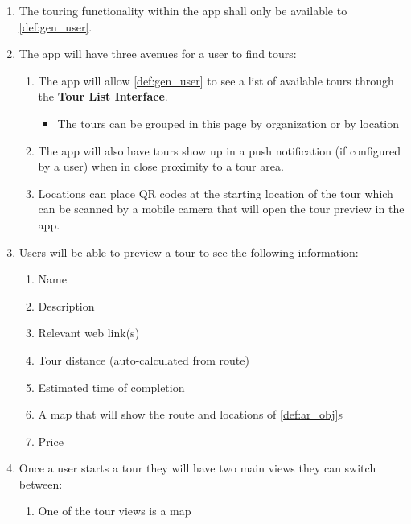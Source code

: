 \documentclass{article}
\begin{document}
\begin{enumerate}[align=left, label=\textbf{TR-FR\arabic*:}]
    \item The touring functionality within the app shall only be available to \ref{def:gen_user}.
    \item The app will have three avenues for a user to find tours:
          \begin{enumerate}[align=left, label=\textbf{TR-FR2.\arabic*:}]
              \item The app will allow \ref{def:gen_user} to see a list of available tours through the \textbf{Tour List Interface}.
                    \begin{itemize}
                        \item The tours can be grouped in this page by organization or by location
                    \end{itemize}
              \item The app will also have tours show up in a push notification (if configured by a user) when in close proximity to a tour area.
              \item Locations can place QR codes at the starting location of the tour which can be scanned by a mobile camera that will open the tour preview in the app.
          \end{enumerate}
    \item Users will be able to preview a tour to see the following information:
          \begin{enumerate}
              \item Name
              \item Description
              \item Relevant web link(s)
              \item Tour distance (auto-calculated from route)
              \item Estimated time of completion
              \item A map that will show the route and locations of \ref{def:ar_obj}s
              \item Price
          \end{enumerate}
    \item Once a user starts a tour they will have two main views they can switch between:
          \begin{enumerate}[align=left, label=\textbf{TR-FR4.\arabic*:}]
              \item One of the tour views is a map
                    \begin{itemize}

\end{itemize}
\end{enumerate}
\end{enumerate}
\end{document}
